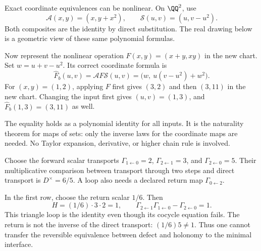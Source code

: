 Exact coordinate equivalences can be nonlinear. On $\QQ^2$, use
\[
\mathcal A(x,y)=(x,y+x^2),\qquad
\mathcal S(u,v)=(u,v-u^2).
\]
Both composites are the identity by direct substitution. The real drawing below is a geometric view of these same polynomial formulas.


Now represent the nonlinear operation $F(x,y)=(x+y,xy)$ in the new chart. Set $w=u+v-u^2$. Its correct coordinate formula is
\[
\widehat F_b(u,v)=\mathcal A F\mathcal S(u,v)
=\bigl(w,\ u(v-u^2)+w^2\bigr).
\]
For $(x,y)=(1,2)$, applying $F$ first gives $(3,2)$ and then $(3,11)$ in the new chart. Changing the input first gives $(u,v)=(1,3)$, and $\widehat F_b(1,3)=(3,11)$ as well.

The equality holds as a polynomial identity for all inputs. It is the naturality theorem for maps of sets: only the inverse laws for the coordinate maps are needed. No Taylor expansion, derivative, or higher chain rule is involved.


Choose the forward scalar transports $\Gamma_{1\leftarrow0}=2$, $\Gamma_{2\leftarrow1}=3$, and $\Gamma_{2\leftarrow0}=5$. Their multiplicative comparison between transport through two steps and direct transport is $D^\times=6/5$. A loop also needs a declared return map $\Gamma_{0\leftarrow2}$.


In the first row, choose the return scalar $1/6$. Then
\[
H=(1/6)\cdot3\cdot2=1,
\qquad \Gamma_{2\leftarrow1}\Gamma_{1\leftarrow0}-\Gamma_{2\leftarrow0}=1.
\]
This triangle loop is the identity even though its cocycle equation fails. The return is not the inverse of the direct transport: $(1/6)5\ne1$. Thus one cannot transfer the reversible equivalence between defect and holonomy to the minimal interface.

